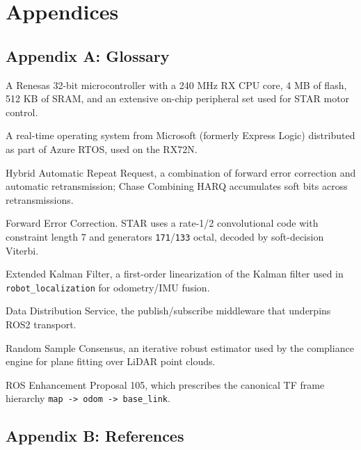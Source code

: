 \documentclass[11pt,letterpaper]{article}
\begin{document}
\section*{Appendices}

\subsection*{Appendix A: Glossary}
\label{sec:glossary}

\begin{description}[leftmargin=4em,style=nextline]
\item[RX72N]
A Renesas 32-bit microcontroller with a 240 MHz RX CPU core, 4 MB of
flash, 512 KB of SRAM, and an extensive on-chip peripheral set used
for STAR motor control.
\item[ThreadX]
A real-time operating system from Microsoft (formerly Express Logic)
distributed as part of Azure RTOS, used on the RX72N.
\item[HARQ]
Hybrid Automatic Repeat Request, a combination of forward error
correction and automatic retransmission; Chase Combining HARQ
accumulates soft bits across retransmissions.
\item[FEC]
Forward Error Correction. STAR uses a rate-1/2 convolutional code
with constraint length 7 and generators \texttt{171}/\texttt{133}
octal, decoded by soft-decision Viterbi.
\item[EKF]
Extended Kalman Filter, a first-order linearization of the Kalman
filter used in \texttt{robot\_localization} for odometry/IMU fusion.
\item[DDS]
Data Distribution Service, the publish/subscribe middleware that
underpins ROS2 transport.
\item[RANSAC]
Random Sample Consensus, an iterative robust estimator used by the
compliance engine for plane fitting over LiDAR point clouds.
\item[REP-105]
ROS Enhancement Proposal 105, which prescribes the canonical TF
frame hierarchy \texttt{map -> odom -> base\_link}.
\end{description}

\subsection*{Appendix B: References}
\end{document}
